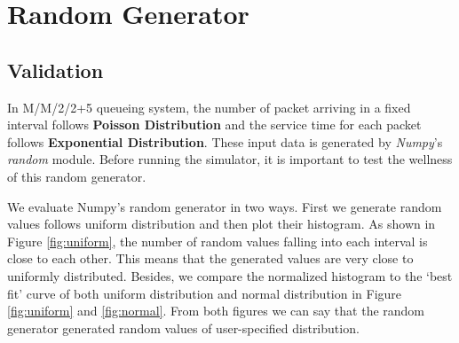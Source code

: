 \documentclass[12pt]{article}  %
\theoremstyle{definition}
\theoremstyle{remark}
\begin{document}

\section{Random Generator}
\subsection{Validation}
In M/M/2/2+5 queueing system, the number of packet arriving in a fixed interval follows \textbf{Poisson Distribution} and the service time for each packet follows \textbf{Exponential Distribution}.
These input data is generated by \textit{Numpy}'s \textit{random} module. Before running the simulator, it is important to test the wellness of this random generator.

We evaluate Numpy's random generator in two ways. First we generate random values follows uniform distribution and then plot their histogram.
As shown in Figure \ref{fig:uniform}, the number of random values falling into each interval is close to each other.
This means that the generated values are very close to uniformly distributed.
Besides, we compare the normalized histogram to the `best fit' curve of both uniform distribution and normal distribution in Figure \ref{fig:uniform} and \ref{fig:normal}.
From both figures we can say that the random generator generated random values of user-specified distribution.
\end{document}

